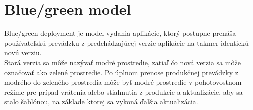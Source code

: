 \documentclass[12pt, a4paper, twoside]{article}
\begin{document}
\section{Blue/green model}
Blue/green deployment je model vydania aplikácie, ktorý postupne prenáša používateľskú prevádzku z predchádzajúcej verzie aplikácie  na takmer identickú novú verziu. \\
Stará verzia sa môže nazývať modré prostredie, zatiaľ čo nová verzia sa môže označovať ako zelené prostredie. Po úplnom prenose produkčnej prevádzky z modrého do zeleného prostredia môže byť modré prostredie v pohotovostnom režime pre prípad vrátenia alebo stiahnutia z produkcie a aktualizácie, aby sa stalo šablónou, na základe ktorej sa vykoná ďalšia aktualizácia.
\end{document}
